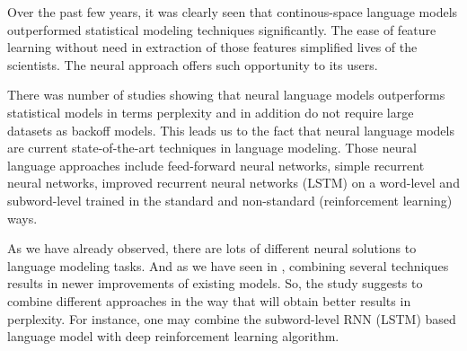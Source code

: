 \documentclass{IEEEtran}
\begin{document}
Over the past few years, it was clearly seen that continous-space language models outperformed statistical modeling techniques significantly. The ease of feature learning without need in extraction of those features simplified lives of the scientists. The neural approach offers such opportunity to its users.

There was number of studies showing that neural language models outperforms statistical models in terms perplexity and in addition do not require large datasets as backoff models. This leads us to the fact that neural language models are current state-of-the-art techniques in language modeling. Those neural language approaches include feed-forward neural networks, simple recurrent neural networks, improved recurrent neural networks (LSTM) on a word-level and subword-level trained in the standard and non-standard (reinforcement learning) ways.

As we have already observed, there are lots of different neural solutions to language modeling tasks. And as we have seen in \cite{Quoc2017Reinforcement}, combining several techniques results in newer improvements of existing models. So, the study suggests to combine different approaches in the way that will obtain better results in perplexity. For instance, one may combine the subword-level RNN (LSTM) based language model with deep reinforcement learning algorithm.



\printbibliography
\end{document}

